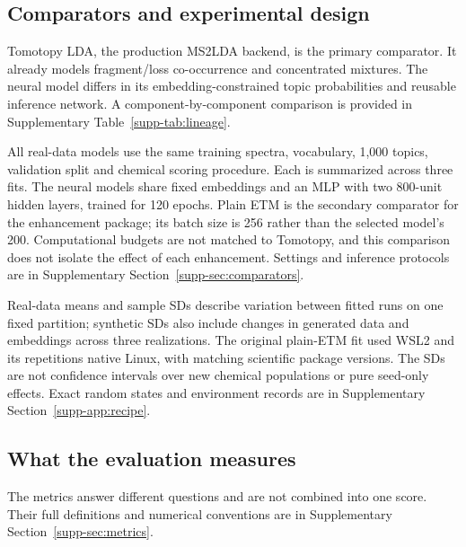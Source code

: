 \documentclass[10pt,a4paper]{article}
\begin{document}


\subsection{Comparators and experimental design}

Tomotopy LDA, the production MS2LDA backend, is the primary comparator.
It already models fragment/loss co-occurrence and concentrated mixtures.
The neural model differs in its embedding-constrained topic probabilities
and reusable inference network. A component-by-component comparison is
provided in Supplementary Table~\ref{supp-tab:lineage}.

All real-data models use the same training spectra, vocabulary, 1,000 topics,
validation split and chemical scoring procedure. Each is summarized across
three fits. The neural models share fixed embeddings and an MLP with two
800-unit hidden layers, trained for 120 epochs. Plain ETM is the secondary
comparator for the enhancement package; its batch size is 256 rather than
the selected model's 200. Computational budgets are not matched to Tomotopy,
and this comparison does not isolate the effect of each enhancement.
Settings and inference protocols are in Supplementary
Section~\ref{supp-sec:comparators}.

Real-data means and sample SDs describe variation between fitted runs on
one fixed partition; synthetic SDs also include changes in generated data
and embeddings across three realizations. The original plain-ETM fit used
WSL2 and its repetitions native Linux, with matching scientific package
versions. The SDs are not confidence intervals over new chemical populations
or pure seed-only effects. Exact random states and environment records are
in Supplementary Section~\ref{supp-app:recipe}.

\subsection{What the evaluation measures}
\label{sec:metrics}

The metrics answer different questions and are not combined into one score.
Their full definitions and numerical conventions are in Supplementary
Section~\ref{supp-sec:metrics}.
\end{document}
